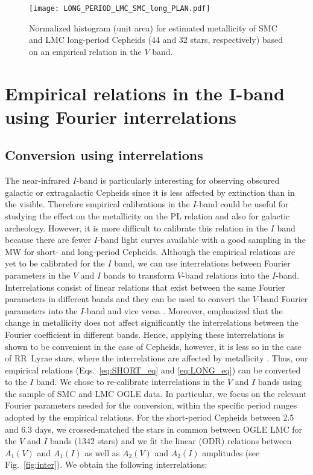\documentclass[article]{aa} %
\begin{document}
\begin{figure}
\begin{center}
\texttt{[image: LONG\_PERIOD\_LMC\_SMC\_long\_PLAN.pdf]}
\caption{\small  Normalized histogram (unit area) for estimated metallicity of SMC and LMC long-period Cepheids (44 and 32 stars, respectively) based on an empirical relation in the $V$ band.} \label{fig:check_phi21_Z}
\end{center}
\end{figure}

\section{Empirical relations in the I-band using Fourier interrelations}\label{sect:I_band}
\subsection{Conversion using interrelations}
The near-infrared $I$-band is particularly interesting for observing obscured galactic or extragalactic Cepheids since it is less affected by extinction than in the visible. Therefore empirical calibrations in the $I$-band could be useful for studying the effect on the metallicity on the PL relation and also for galactic archeology. However, it is more difficult to calibrate this relation in the $I$ band because there are fewer $I$-band light curves available with a good sampling in the MW for short- and long-period Cepheids. Although the empirical relations are yet to be calibrated for the $I$ band, we can use interrelations between Fourier parameters in the $V$ and $I$ bands to transform $V$-band relations into the $I$-band. Interrelations consist of linear relations that exist between the same Fourier parameters in different bands and they can be used to convert the $V$-band Fourier parameters into the $I$-band and vice versa \citep{Hendry1999,2000Kanbur,Ngeow2003}. Moreover, \cite{Ngeow2003} emphasized that the change in metallicity does not affect significantly the interrelations between the Fourier coefficient in different bands. Hence, applying these interrelations is shown to be convenient in the case of Cepheids, however, it is less so in the case of RR~Lyrae stars, where the interrelations are affected by metallicity \citep{Skowron2016}.  Thus, our empirical relations (Eqs.~\ref{eq:SHORT_eq} and \ref{eq:LONG_eq}) can be converted to the $I$ band. 
We chose to re-calibrate interrelations in the $V$ and $I$ bands using the sample of SMC and LMC OGLE data. In particular, we focus on the relevant Fourier parameters needed for the conversion, within the specific period ranges adopted by the empirical relations. For the short-period Cepheids between 2.5 and 6.3 days, we crossed-matched the stars in common between OGLE LMC for the $V$ and $I$ bands (1342 stars) and we fit the linear (ODR) relations between $A_1(V)$ and $A_1(I)$ as well as $A_2(V)$ and $A_2(I)$ amplitudes (see Fig.~\ref{fig:inter}). We obtain the following interrelations:
\end{document}
